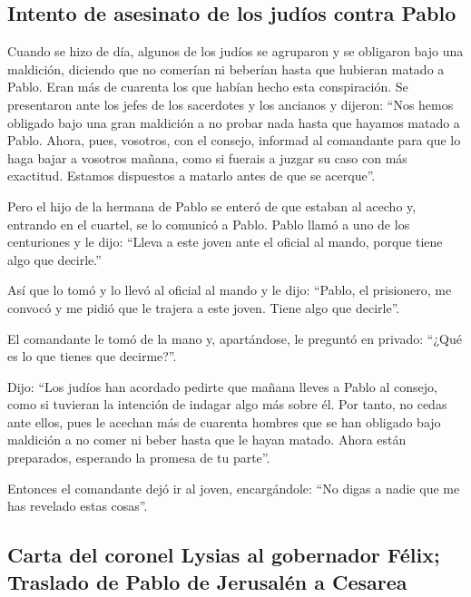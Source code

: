 \begin{paracol}{2}
\hypertarget{intento-de-asesinato-de-los-juduxedos-contra-pablo}{%
\subsection{Intento de asesinato de los judíos contra
Pablo}\label{intento-de-asesinato-de-los-juduxedos-contra-pablo}}

 Cuando se hizo de día, algunos de los judíos se
agruparon y se obligaron bajo una maldición, diciendo que no comerían ni
beberían hasta que hubieran matado a Pablo.  Eran más de
cuarenta los que habían hecho esta conspiración.  Se
presentaron ante los jefes de los sacerdotes y los ancianos y dijeron:
``Nos hemos obligado bajo una gran maldición a no probar nada hasta que
hayamos matado a Pablo.  Ahora, pues, vosotros, con el
consejo, informad al comandante para que lo haga bajar a vosotros
mañana, como si fuerais a juzgar su caso con más exactitud. Estamos
dispuestos a matarlo antes de que se acerque''.

 Pero el hijo de la hermana de Pablo se enteró de que
estaban al acecho y, entrando en el cuartel, se lo comunicó a Pablo.
 Pablo llamó a uno de los centuriones y le dijo: ``Lleva
a este joven ante el oficial al mando, porque tiene algo que decirle.''

 Así que lo tomó y lo llevó al oficial al mando y le
dijo: ``Pablo, el prisionero, me convocó y me pidió que le trajera a
este joven. Tiene algo que decirle''.

 El comandante le tomó de la mano y, apartándose, le
preguntó en privado: ``¿Qué es lo que tienes que decirme?''.

 Dijo: ``Los judíos han acordado pedirte que mañana
lleves a Pablo al consejo, como si tuvieran la intención de indagar algo
más sobre él.  Por tanto, no cedas ante ellos, pues le
acechan más de cuarenta hombres que se han obligado bajo maldición a no
comer ni beber hasta que le hayan matado. Ahora están preparados,
esperando la promesa de tu parte''.

 Entonces el comandante dejó ir al joven, encargándole:
``No digas a nadie que me has revelado estas cosas''.

\hypertarget{carta-del-coronel-lysias-al-gobernador-fuxe9lix-traslado-de-pablo-de-jerusaluxe9n-a-cesarea}{%
\subsection{Carta del coronel Lysias al gobernador Félix; Traslado de
Pablo de Jerusalén a
Cesarea}\label{carta-del-coronel-lysias-al-gobernador-fuxe9lix-traslado-de-pablo-de-jerusaluxe9n-a-cesarea}}


\end{paracol}
